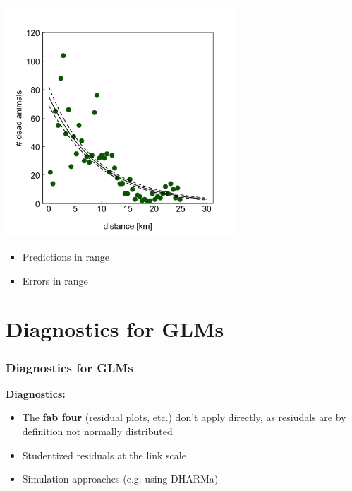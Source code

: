 \documentclass{beamer}
\begin{document}
\begin{frame}
    \frametitle{}
    \begin{center}
        \includegraphics[width=0.65\textwidth]{lectures/day_9_refreshing_glm/figures/unnamed-chunk-25-1.png}
    \end{center}
    \begin{itemize}
    \centering
        \item Predictions in range
        \item Errors in range
    \end{itemize}
\end{frame}
\section{Diagnostics for GLMs}

\begin{frame}[fragile]
    \frametitle{Diagnostics for GLMs}
    \large
    \textbf{Diagnostics:}
    \begin{itemize}
        \item The \textbf{fab four} (residual plots, etc.) don't apply directly, as resiudals are by definition not normally distributed
        \item Studentized residuals at the link scale
        \item Simulation approaches (e.g. using DHARMa)
    \end{itemize}
\end{frame}
\end{document}
